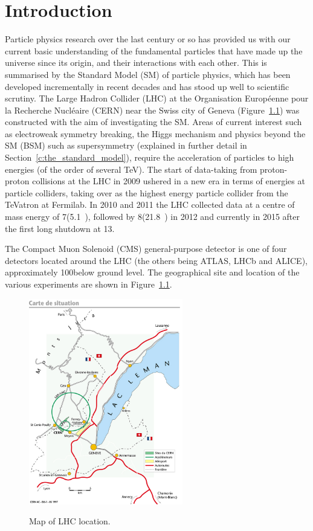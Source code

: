 \chapter{Introduction}
\label{c:introduction}
Particle physics research over the last century or so has provided us with our current basic understanding of
the fundamental particles that have made up the universe since its origin, and their interactions with each
other. This is summarised by the Standard Model (SM) of particle physics, which has been developed
incrementally in recent decades and has stood up well to scientific scrutiny. The Large Hadron Collider (LHC)
at the Organisation Europ\'{e}enne pour la Recherche Nucl\'{e}aire (CERN) near the Swiss city of Geneva
(Figure~\ref{fig:LHC_map}) was constructed with the aim of investigating the SM. Areas of current interest
such as electroweak symmetry breaking, the Higgs mechanism and physics beyond the SM (BSM) such as
supersymmetry (explained in further detail in Section~\ref{c:the_standard_model}), require the acceleration of
particles to high energies (of the order of several TeV). The start of data-taking from proton-proton
collisions at the LHC in 2009 ushered in a new era in terms of energies at particle colliders, taking over as
the highest energy particle collider from the TeVatron at Fermilab. In 2010 and 2011 the LHC collected data at
a centre of mass energy of 7\TeV (5.1~\fbinv), followed by 8\TeV (21.8~\fbinv) in 2012 and currently in 2015
after the first long shutdown at 13\TeV.

The Compact Muon Solenoid (CMS) general-purpose detector is one of four detectors located around the LHC (the
others being ATLAS, LHCb and ALICE), approximately 100\m below ground level. The geographical site and
location of the various experiments are shown in Figure~\ref{fig:LHC_map}.

\begin{figure}[!hbtp]
   \centering
     \includegraphics[width=0.6\textwidth]{Chapters/01_Introduction/Images/lhc-pho-1997-169.jpg}\\
     \caption{Map of LHC location.}
     \label{fig:LHC_map}
\end{figure}

